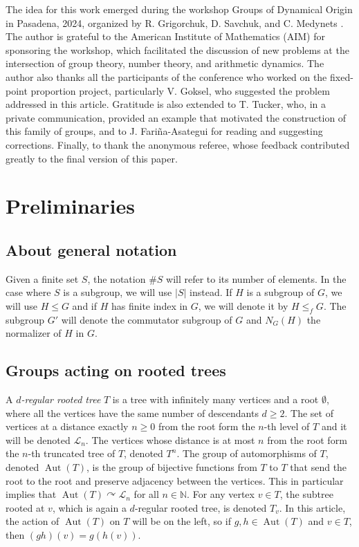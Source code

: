 \documentclass{amsart}
\def\abs#1{\left\vert{#1}\right\vert}
\def\NN{\mathbb N}
\DeclareMathOperator{\Aut}{Aut}
\begin{document}
The idea for this work emerged during the workshop Groups of Dynamical Origin in Pasadena, 2024, organized by R. Grigorchuk, D. Savchuk, and C. Medynets \cite{Dynamicalorigin2024}. The author is grateful to the American Institute of Mathematics (AIM) for sponsoring the workshop, which facilitated the discussion of new problems at the intersection of group theory, number theory, and arithmetic dynamics. The author also thanks all the participants of the conference who worked on the fixed-point proportion project, particularly V. Goksel, who suggested the problem addressed in this article. Gratitude is also extended to T. Tucker, who, in a private communication, provided an example that motivated the construction of this family of groups, and to J. Fariña-Asategui for reading and suggesting corrections. Finally, to thank the anonymous referee, whose feedback contributed greatly to the final version of this paper.


\section{Preliminaries}
\label{section: preliminaries}

\subsection{About general notation} 

Given a finite set $S$, the notation $\#S$ will refer to its number of elements. In the case where $S$ is a subgroup, we will use $\abs{S}$ instead. If $H$ is a subgroup of $G$, we will use $H \leq G$ and if $H$ has finite index in $G$, we will denote it by $H \leq_f G$. The subgroup $G'$ will denote the commutator subgroup of $G$ and $N_G(H)$ the normalizer of $H$ in $G$. 

\subsection{Groups acting on rooted trees}
\label{subsec_Groups_acting_on_trees}

A \textit{$d$-regular rooted tree} $T$ is a tree with infinitely many vertices and a root $\emptyset$, where all the vertices have the same number of descendants $d \geq 2$. The set of vertices at a distance exactly $n\ge 0$ from the root form the $n$-th level of $T$ and it will be denoted $\mathcal{L}_n$. The vertices whose distance is at most $n$ from the root form the $n$-th truncated tree of $T$, denoted $T^n$. The group of automorphisms of $T$, denoted $\Aut(T)$, is the group of bijective functions from $T$ to $T$ that send the root to the root and preserve adjacency between the vertices. This in particular implies that $\Aut(T) \curvearrowright \mathcal{L}_n$ for all $n \in \NN$. For any vertex $v\in T$, the subtree rooted at $v$, which is again a $d$-regular rooted tree, is denoted $T_v$. In this article, the action of $\Aut(T)$ on $T$ will be on the left, so if $g,h \in \Aut(T)$ and $v \in T$, then $(gh)(v) = g(h(v))$. 
\end{document}
